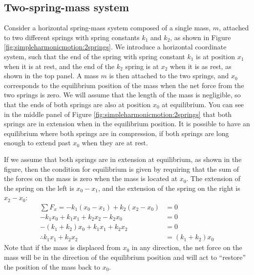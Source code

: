 \subsection{Two-spring-mass system}
Consider a horizontal spring-mass system composed of a single mass, $m$, attached to two different springs with spring constants $k_1$ and $k_2$, as shown in Figure \ref{fig:simpleharmonicmotion:2springs}.
We introduce a horizontal coordinate system, such that the end of the spring with spring constant $k_1$ is at position $x_1$ when it is at rest, and the end of the $k_2$ spring is at $x_2$ when it is as rest, as shown in the top panel. A mass $m$ is then attached to the two springs, and $x_0$ corresponds to the equilibrium position of the mass when the net force from the two springs is zero. We will assume that the length of the mass is negligible, so that the ends of both springs are also at position $x_0$ at equilibrium. You can see in the middle panel of Figure \ref{fig:simpleharmonicmotion:2springs} that both springs are in extension when in the equilibrium position. It is possible to have an equilibrium where both springs are in compression, if both springs are long enough to extend past $x_0$ when they are at rest. 

If we assume that both springs are in extension at equilibrium, as shown in the figure, then the condition for equilibrium is given by requiring that the sum of the forces on the mass is zero when the mass is located at $x_0$. The extension of the spring on the left is $x_0 - x_1$, and the extension of the spring on the right is $x_2-x_0$:
\begin{align*}
\sum F_x = -k_1(x_0-x_1) + k_2 (x_2 - x_0) &= 0\\
-k_1x_0+k_1x_1+k_2x_2-k_2x_0 &=0\\
-(k_1+k_2)x_0 +k_1x_1+k_2x_2 &=0\\
\therefore k_1x_1+k_2x_2 &=(k_1+k_2)x_0
\end{align*}
Note that if the mass is displaced from $x_0$ in any direction, the net force on the mass will be in the direction of the equilibrium position and will act to ``restore'' the position of the mass back to $x_0$. 

